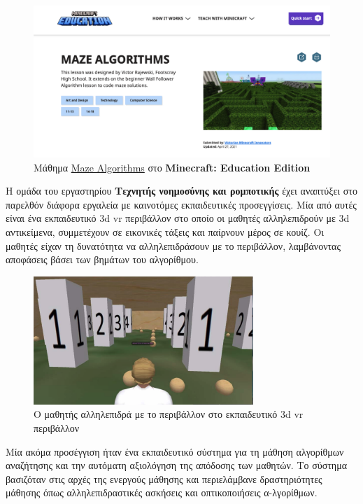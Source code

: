 \begin{figure}[H]
    \centering
    \includegraphics[width=0.8\linewidth]{sections/3/images/minecraft_edu}
    \caption{Μάθημα \underline{Maze Algorithms} στο \textbf{Minecraft: Education Edition}}
    \label{fig:minecraft_edu}
\end{figure}

Η ομάδα του εργαστηρίου \textbf{Τεχνητής νοημοσύνης και ρομποτικής} έχει αναπτύξει στο παρελθόν διάφορα εργαλεία με καινοτόμες εκπαιδευτικές προσεγγίσεις. Μία από αυτές είναι ένα εκπαιδευτικό \acrshort{3d} \acrshort{vr} περιβάλλον στο οποίο οι μαθητές αλληλεπιδρούν με \acrshort{3d} αντικείμενα, συμμετέχουν σε εικονικές τάξεις και παίρνουν μέρος σε κουίζ. Οι μαθητές είχαν τη δυνατότητα να αλληλεπιδράσουν με το περιβάλλον, λαμβάνοντας αποφάσεις βάσει των βημάτων του αλγορίθμου\cite{grivokostopoulou_innovative_2016}.

\begin{figure}[H]
    \centering
    \includegraphics[width=0.8\linewidth]{sections/3/images/3d_vr}
    \caption{Ο μαθητής αλληλεπιδρά με το περιβάλλον στο εκπαιδευτικό \acrshort{3d} \acrshort{vr} περιβάλλον}
    \label{fig:3d_vr}
\end{figure}

Μία ακόμα προσέγγιση ήταν ένα εκπαιδευτικό σύστημα για τη μάθηση αλγορίθμων αναζήτησης και την αυτόματη αξιολόγηση της απόδοσης των μαθητών. Το σύστημα βασιζόταν στις αρχές της ενεργούς μάθησης και περιελάμβανε δραστηριότητες μάθησης όπως αλληλεπιδραστικές ασκήσεις και οπτικοποιήσεις α-λγορίθμων\cite{grivokostopoulou_educational_2017}.

